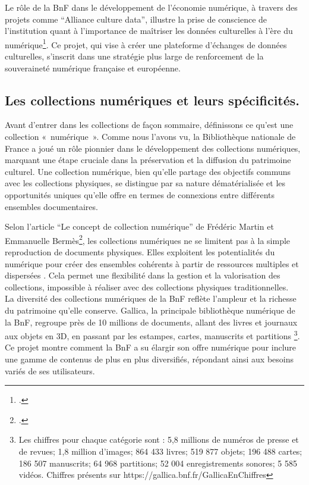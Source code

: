 \documentclass[a4paper,12pt,twoside]{book}
\begin{document}
	Le rôle de la BnF dans le développement de l’économie numérique, à travers des projets comme “Alliance culture data”, illustre la prise de conscience de l’institution quant à l’importance de maîtriser les données culturelles à l’ère du numérique\footcite{engel_numerique_2022}. Ce projet, qui vise à créer une plateforme d’échanges de données culturelles, s’inscrit dans une stratégie plus large de renforcement de la souveraineté numérique française et européenne.
	
	\subsection{Les  collections numériques et leurs spécificités.}
	
	Avant d’entrer dans les collections de façon sommaire, définissons ce qu’est une collection « numérique ». Comme nous l’avons vu, la Bibliothèque nationale de France a joué un rôle pionnier dans le développement des collections numériques, marquant une étape cruciale dans la préservation et la diffusion du patrimoine culturel. Une collection numérique, bien qu’elle partage des objectifs communs avec les collections physiques, se distingue par sa nature dématérialisée et les opportunités uniques qu’elle offre en termes de connexions entre différents ensembles documentaires.
	
	Selon l’article “Le concept de collection numérique” de Frédéric Martin et Emmanuelle Bermès\footcite{martin_concept_2010}, les collections numériques ne se limitent pas à la simple reproduction de documents physiques. Elles exploitent les potentialités du numérique pour créer des ensembles cohérents à partir de ressources multiples et dispersées . Cela permet une flexibilité dans la gestion et la valorisation des collections, impossible à réaliser avec des collections physiques traditionnelles.
	\\
	
	La diversité des collections numériques de la BnF reflète l’ampleur et la richesse du patrimoine qu’elle conserve. Gallica, la principale bibliothèque numérique de la BnF, regroupe près de 10 millions de documents, allant des livres et journaux aux objets en 3D, en passant par les estampes, cartes, manuscrits et partitions \footnote{Les chiffres pour chaque catégorie sont : 5,8 millions de numéros de presse et de revues; 1,8 million d’images; 864 433 livres; 519 877 objets; 196 488 cartes; 186 507 manuscrits; 64 968 partitions; 52 004 enregistrements sonores; 5 585 vidéos. Chiffres présents sur https://gallica.bnf.fr/GallicaEnChiffres}. Ce projet montre comment la BnF a su élargir son offre numérique pour inclure une gamme de contenus de plus en plus diversifiés, répondant ainsi aux besoins variés de ses utilisateurs.
	
\end{document}
